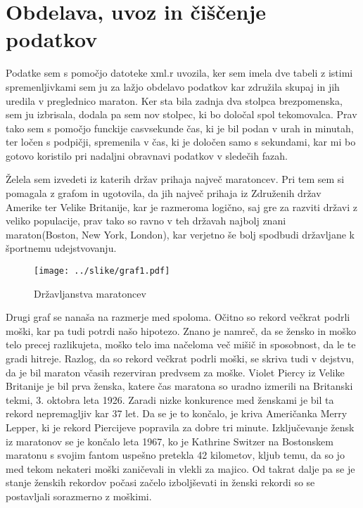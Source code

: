 \documentclass[11pt,a4paper]{article}
\begin{document}
\pagebreak
\section{Obdelava, uvoz in čiščenje podatkov}

Podatke sem s pomočjo datoteke xml.r uvozila, ker sem imela dve tabeli z istimi spremenljivkami sem ju za lažjo obdelavo podatkov kar združila skupaj in jih uredila v preglednico maraton. Ker sta bila zadnja dva stolpca brezpomenska, sem ju izbrisala, dodala pa sem nov stolpec, ki bo določal spol tekomovalca. Prav tako sem s pomočjo funckije casvsekunde čas, ki je bil podan v urah in minutah, ter ločen s podpičji, spremenila v čas, ki je določen samo s sekundami, kar mi bo gotovo koristilo pri nadaljni obravnavi podatkov v sledečih fazah.


Želela sem izvedeti iz katerih držav prihaja največ maratoncev. Pri tem sem si pomagala z grafom in ugotovila, da jih največ prihaja iz Združenih držav Amerike ter Velike Britanije, kar je razmeroma logično, saj gre za razviti državi z veliko populacije, prav tako so ravno v teh državah najbolj znani maraton(Boston, New York, London), kar verjetno še bolj spodbudi državljane k športnemu udejstvovanju.

\begin{figure}[H]
  \texttt{[image: ../slike/graf1.pdf]}
  \caption{Državljanstva maratoncev}
  \label{fig:Slika 1}
\end{figure}


Drugi graf se nanaša na razmerje med spoloma. Očitno so rekord večkrat podrli moški, kar pa tudi potrdi našo hipotezo. Znano je namreč, da se žensko in moško telo precej razlikujeta, moško telo ima načeloma več mišič in sposobnost, da le te gradi hitreje.
Razlog, da so rekord večkrat podrli moški, se skriva tudi v dejstvu, da je bil maraton včasih rezerviran predvsem za moške. Violet Piercy iz Velike Britanije je bil prva ženska, katere čas maratona so uradno izmerili na Britanski tekmi, 3. oktobra leta 1926. Zaradi nizke konkurence med ženskami je bil ta rekord nepremagljiv kar 37 let. Da se je to končalo, je kriva Američanka Merry Lepper, ki je rekord Piercijeve popravila za dobre tri minute.
Izključevanje žensk iz maratonov se je končalo leta 1967, ko je Kathrine Switzer na Bostonskem maratonu s svojim fantom uspešno pretekla 42 kilometov, kljub temu, da so jo med tekom nekateri moški zaničevali in vlekli za majico. Od takrat dalje pa se je stanje ženskih rekordov počasi začelo izboljševati in ženski rekordi so se postavljali sorazmerno z moškimi.
\end{document}
